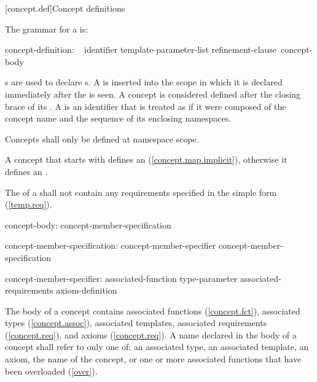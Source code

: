 \documentclass[american]{book}
\begin{document}
\begin{paras}
[concept.def]{Concept definitions}

\pnum
The grammar for a  is:

\begin{bnf}
%
concept-definition:\br
         \opt\  identifier \terminal{<} template-parameter-list \terminal{>} refinement-clause\opt\ concept-body \terminal{;}\opt\ \br
\end{bnf}

\pnum 
{}s are used to declare
s. A  is inserted into
the scope in which it is declared immediately after the
 is seen. A concept is considered defined after
the closing brace of its . A  is an identifier that is treated as if it were
composed of the concept name and the sequence of its enclosing namespaces.

\pnum 
Concepts shall only be defined at namespace scope.

\pnum
A concept that starts with  defines an 
(\mbox{\ref{concept.map.implicit}}), otherwise it defines an
. 

\pnum 
The  of a
 shall not contain any requirements
specified in the simple form (\ref{temp.req}).

\pnum

\begin{bnf}
concept-body:\br
         \terminal{\{} concept-member-specification\opt\ \terminal{\}}\br

concept-member-specification:\br
         concept-member-specifier concept-member-specification\opt\ \br

concept-member-specifier:\br
         associated-function\br
         type-parameter \terminal{;}\br
         associated-requirements\br
         axiom-definition
\end{bnf}

The body of a concept contains associated functions
(\ref{concept.fct}), associated types (\ref{concept.assoc}),
associated templates, 
associated requirements \textcolor{addclr}{(\ref{concept.req})}, and axioms
(\ref{concept.req}). A name  declared in the body of a
concept shall refer to only one of: an associated type, an associated
template, an axiom, the name of the concept, or one or more associated
functions that have been overloaded (\ref{over}). 


\end{paras}
\end{document}
